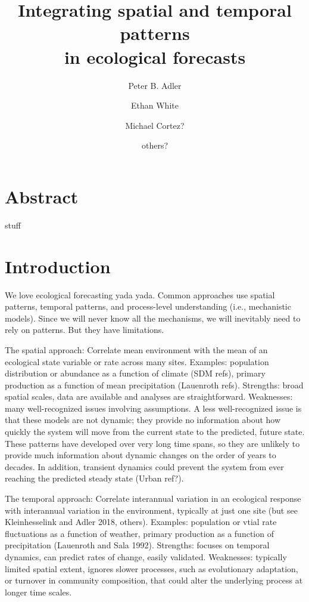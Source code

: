 \documentclass[11pt]{article}
\title{\textbf{Integrating spatial and temporal patterns \\ in ecological forecasts }}
\author[1]{Peter B. Adler}  %
\author[2]{Ethan White}
\author[3]{Michael Cortez?}
\author[4]{others?}
\affil[1]{Department of Wildland Resources and the Ecology Center, Utah State University, Logan, Utah}
\affil[2]{some shitty Florida joint}
\begin{document}
\maketitle

\linenumbers

\section*{Abstract}

stuff


\section*{Introduction}

We love ecological forecasting yada yada. Common approaches use spatial patterns, temporal patterns, and process-level understanding (i.e., mechanistic models). Since we will never know all the mechanisms, we will inevitably need to rely on patterns. But they have limitations.

The spatial approach: Correlate mean environment with the mean of an ecological state variable or rate across many sites. Examples: population distribution or abundance as a function of climate (SDM refs), primary production as a function of mean precipitation (Lauenroth refs).  Strengths: broad spatial scales, data are available and analyses are straightforward. Weaknesses: many well-recognized issues involving assumptions. A less well-recognized issue is that these models are not dynamic; they provide no information about how quickly the system will move from the current state to the predicted, future state. These patterns have developed over very long time spans, so they are unlikely to provide much information about dynamic changes on the order of years to decades. In addition, transient dynamics could prevent the system from ever reaching the predicted steady state (Urban ref?). 

The temporal approach: Correlate interannual variation in an ecological response with interannual variation in the environment, typically at just one site (but see Kleinhesselink  and Adler 2018, others). Examples: population or vtial rate fluctuations as a function of weather, primary production as a function of precipitation (Lauenroth and Sala 1992). Strengths: focuses on temporal dynamics, can predict rates of change, easily validated. Weaknesses: typically limited spatial extent, ignores slower processes, such as evolutionary adaptation, or turnover in community composition, that could alter the underlying process at longer time scales.
\end{document}
